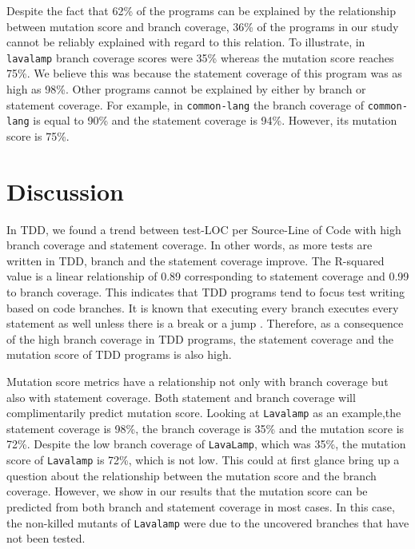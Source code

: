 \documentclass[conference]{IEEEtran}
\begin{document}
Despite the fact that 62\% of the programs can be explained by the relationship between mutation score and branch coverage,  36\% of the programs in our study cannot be reliably explained with regard to this relation. %
To illustrate, in \texttt{lavalamp}  branch coverage scores were 35\% whereas the mutation score reaches 75\%. We believe this was because the statement coverage of this program was as high as 98\%. Other programs cannot be explained by either by branch or statement coverage. For example, in \texttt{common-lang} the branch coverage of \texttt{common-lang} is equal to 90\% and the statement coverage is 94\%. However, its mutation score is 75\%. 

\section{Discussion}
In TDD, we found a trend between test-LOC per Source-Line of Code with high branch coverage and statement coverage. In other words, as more tests are written in TDD, branch and the statement coverage improve. The R-squared value is a linear relationship of 0.89 corresponding to statement coverage and 0.99 to branch coverage. This indicates that TDD programs tend to focus test writing based on code branches. It is known that executing every branch executes every statement as well unless there is a break or a jump \cite{hoffmann2007code}. Therefore, as a consequence of the high branch coverage in TDD programs, the statement coverage and the mutation score of TDD programs is also high.

Mutation score metrics have a relationship not only with branch coverage but also with statement coverage. Both statement and branch coverage will complimentarily predict mutation score. Looking at \texttt{Lavalamp} as an example,the statement coverage is 98\%, the branch coverage is 35\% and the mutation score is 72\%. Despite the low branch coverage of \texttt{LavaLamp}, which was 35\%, the mutation score of \texttt{Lavalamp} is 72\%, which is not low. This could at first glance bring up a question about the relationship between the mutation score and the branch coverage. However, we show in our results that the mutation score can be predicted from both branch and statement coverage in most cases. In this case, the non-killed mutants of \texttt{Lavalamp} were due to the uncovered branches that have not been tested.     
\end{document}
